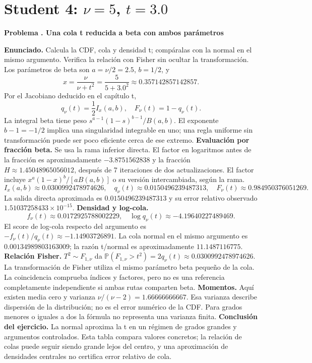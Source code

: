 \documentclass[11pt,a4paper]{article}
\newcommand{\Prob}{\mathbb P}
\theoremstyle{definition}
\newcounter{problema}
\newenvironment{resuelto}[1]{\refstepcounter{problema}\par\medskip\Needspace{6\baselineskip}\textbf{Problema \theproblema. #1}\par}{\par\medskip}
\begin{document}
\section{\texorpdfstring{Student 4: $\nu=5$, $t=3.0$}{Student 4: nu=5, t=3.0}}
\begin{resuelto}{Una cola t reducida a beta con ambos parámetros}
\textbf{Enunciado.} Calcula la CDF, cola y densidad t; compáralas con la normal en el mismo argumento. Verifica la relación con Fisher sin ocultar la transformación.
Los parámetros de beta son $a=\nu/2=2.5$, $b=1/2$, y
\[
x=\frac{\nu}{\nu+t^2}=\frac{5}{5+3.0^2}\approx0.357142857142857.
\]
Por el Jacobiano deducido en el capítulo t,
\[
q_\nu(t)=\frac12 I_x(a,b),\quad F_\nu(t)=1-q_\nu(t).
\]
La integral beta tiene peso $s^{a-1}(1-s)^{b-1}/B(a,b)$. El exponente $b-1=-1/2$ implica una singularidad integrable en uno; una regla uniforme sin transformación puede ser poco eficiente cerca de ese extremo.
\textbf{Evaluación por fracción beta.} Se usa la rama inferior directa. El factor en logaritmos antes de la fracción es aproximadamente $-3.8751562838$ y la fracción $H\approx1.45048965056012$, después de 7 iteraciones de dos actualizaciones. El factor incluye $x^a(1-x)^b/[aB(a,b)]$ o su versión intercambiada, según la rama.
\[
I_x(a,b)\approx0.0300992478974626,\quad q_\nu(t)\approx0.0150496239487313,\quad F_\nu(t)\approx0.984950376051269.
\]
La salida directa aproximada es $0.0150496239487313$ y su error relativo observado $1.51037258433\times10^{-15}$.
\textbf{Densidad y log-cola.}
\[
f_\nu(t)\approx0.0172925788002229,\quad
\log q_\nu(t)\approx-4.19640227489469.
\]
El score de log-cola respecto del argumento es $-f_\nu(t)/q_\nu(t)\approx-1.14903726891$. La cola normal en el mismo argumento es $0.00134989803163009$; la razón t/normal es aproximadamente $11.1487116775$.
\textbf{Relación Fisher.} $T^2\sim F_{1,\nu}$ da $\Prob(F_{1,\nu}>t^2)=2q_\nu(t)\approx0.0300992478974626$. La transformación de Fisher utiliza el mismo parámetro beta pequeño de la cola. La coincidencia comprueba índices y factores, pero no es una referencia completamente independiente si ambas rutas comparten beta.
\textbf{Momentos.} Aquí existen media cero y varianza $\nu/(\nu-2)=1.66666666667$. Esa varianza describe dispersión de la distribución; no es el error numérico de la CDF. Para grados menores o iguales a dos la fórmula no representa una varianza finita.
\textbf{Conclusión del ejercicio.} La normal aproxima la t en un régimen de grados grandes y argumentos controlados. Esta tabla compara valores concretos; la relación de colas puede seguir siendo grande lejos del centro, y una aproximación de densidades centrales no certifica error relativo de cola.
\end{resuelto}
\end{document}
